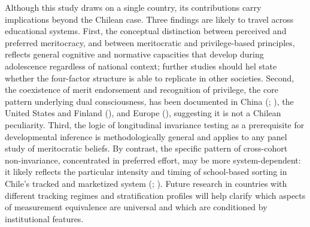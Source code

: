 \documentclass[
  13pt,
]{article}
\begin{document}
Although this study draws on a single country, its contributions carry
implications beyond the Chilean case. Three findings are likely to
travel across educational systems. First, the conceptual distinction
between perceived and preferred meritocracy, and between meritocratic
and privilege-based principles, reflects general cognitive and normative
capacities that develop during adolescence regardless of national
context; further studies should hel state whether the four-factor
structure is able to replicate in other societies. Second, the
coexistence of merit endorsement and recognition of privilege, the core
pattern underlying dual consciousness, has been documented in China
(;
), the United
States and Finland (),
and Europe (), suggesting it is not a Chilean peculiarity. Third, the
logic of longitudinal invariance testing as a prerequisite for
developmental inference is methodologically general and applies to any
panel study of meritocratic beliefs. By contrast, the specific pattern
of cross-cohort non-invariance, concentrated in preferred effort, may be
more system-dependent: it likely reflects the particular intensity and
timing of school-based sorting in Chile's tracked and marketized system
(;
).
Future research in countries with different tracking regimes and
stratification profiles will help clarify which aspects of measurement
equivalence are universal and which are conditioned by institutional
features.
\end{document}
